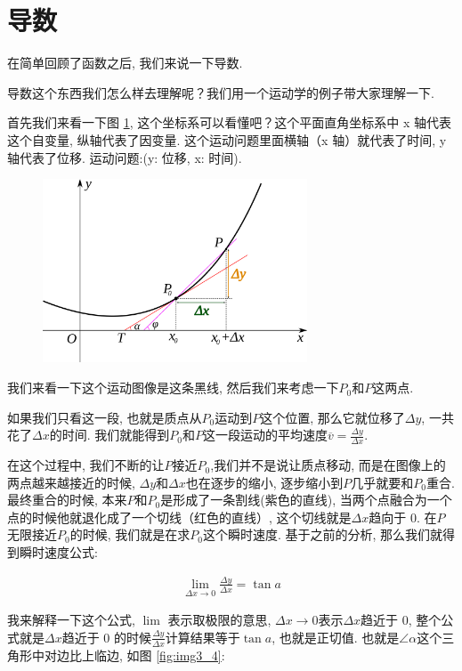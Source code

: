 \section{导数}

在简单回顾了函数之后, 我们来说一下导数. 

导数这个东西我们怎么样去理解呢？我们用一个运动学的例子带大家理解一下. 

首先我们来看一下图 \ref{fig:img3_3}, 这个坐标系可以看懂吧？这个平面直角坐标系中 x 轴代表这个自变量, 纵轴代表了因变量. 这个运动问题里面横轴（x 轴）就代表了时间, y 轴代表了位移. 运动问题:(y: 位移,  x: 时间).

\begin{figure}[ht]
  \centering
  \includegraphics[width=0.7\textwidth]{asset/8b53b1a6-4a67-4402-b86a-b29dab8c535b.png}
  \caption{}
  \label{fig:img3_3}
\end{figure}


我们来看一下这个运动图像是这条黑线, 然后我们来考虑一下$P_0$和$P$这两点. 

如果我们只看这一段, 也就是质点从$P_0$运动到$P$这个位置, 那么它就位移了$\Delta y$, 一共花了$\Delta x$的时间. 我们就能得到$P_0$和$P$这一段运动的平均速度$\overline{v}=\frac{\Delta y}{\Delta x}$. 

在这个过程中, 我们不断的让$P$接近$P_0$,我们并不是说让质点移动, 而是在图像上的两点越来越接近的时候, $\Delta y$和$\Delta x$也在逐步的缩小,  逐步缩小到$P$几乎就要和$P_0$重合. 最终重合的时候, 本来$P$和$P_0$是形成了一条割线(紫色的直线), 当两个点融合为一个点的时候他就退化成了一个切线（红色的直线）, 这个切线就是$\Delta x$趋向于 0. 在$P$无限接近$P_0$的时候, 我们就是在求$P_0$这个瞬时速度. 基于之前的分析, 那么我们就得到瞬时速度公式:

\begin{align*}
  \lim_{\Delta x\to0} \frac{\Delta y}{\Delta x}=\tan a
\end{align*}

我来解释一下这个公式, $\lim$ 表示取极限的意思, $\Delta x \to 0$表示$\Delta x$趋近于 0,  整个公式就是$\Delta x$趋近于 0 的时候$\frac{\Delta y}{\Delta x}$计算结果等于$\tan a$, 也就是正切值. 也就是$\angle \alpha$这个三角形中对边比上临边, 如图 \ref{fig:img3_4}:

